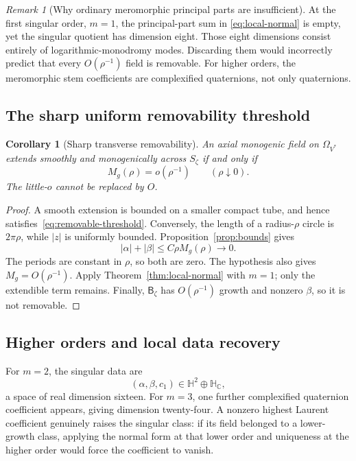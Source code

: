 \documentclass[11pt,a4paper]{article}
\numberwithin{equation}{section}
\newtheorem{corollary}[theorem]{Corollary}
\theoremstyle{definition}
\theoremstyle{remark}
\newtheorem{remark}[theorem]{Remark}
\newcommand{\C}{\mathbb C}
\newcommand{\HH}{\mathbb H}
\newcommand{\HC}{\mathbb H_{\C}}
\newcommand{\Bdef}{\mathsf B}
\begin{document}
\begin{remark}[Why ordinary meromorphic principal parts are insufficient]
At the first singular order, $m=1$, the principal-part sum in
\eqref{eq:local-normal} is empty, yet the singular quotient has dimension
eight. Those eight dimensions consist entirely of logarithmic-monodromy
modes. Discarding them would incorrectly predict that every
$O(\rho^{-1})$ field is removable. For higher orders, the meromorphic
stem coefficients are complexified quaternions, not only quaternions.
\end{remark}

\subsection{The sharp uniform removability threshold}
\begin{corollary}[Sharp transverse removability]\label{cor:removable}
An axial monogenic field on $\Omega_{V^*}$ extends smoothly and
monogenically across $S_\zeta$ if and only if
\begin{equation}
 M_g(\rho)=o(\rho^{-1})\qquad(\rho\downarrow0).
 \label{eq:removable-threshold}
\end{equation}
The little-$o$ cannot be replaced by $O$.
\end{corollary}
\begin{proof}
A smooth extension is bounded on a smaller compact tube, and hence
satisfies~\eqref{eq:removable-threshold}. Conversely, the length of a
radius-$\rho$ circle is $2\pi\rho$, while $|z|$ is uniformly bounded.
Proposition~\ref{prop:bounds} gives
\[
 |\alpha|+|\beta|\le C\rho M_g(\rho)\longrightarrow0.
\]
The periods are constant in $\rho$, so both are zero. The hypothesis
also gives $M_g=O(\rho^{-1})$. Apply Theorem~\ref{thm:local-normal}
with $m=1$; only the extendible term remains. Finally,
$\Bdef_\zeta$ has $O(\rho^{-1})$ growth and nonzero $\beta$, so it is
not removable.
\end{proof}

\subsection{Higher orders and local data recovery}
For $m=2$, the singular data are
\[
 (\alpha,\beta,c_1)\in\HH^2\oplus\HC,
\]
a space of real dimension sixteen. For $m=3$, one further complexified
quaternion coefficient appears, giving dimension twenty-four.
A nonzero highest Laurent coefficient genuinely raises the singular
class: if its field belonged to a lower-growth class, applying the
normal form at that lower order and uniqueness at the higher order
would force the coefficient to vanish.
\end{document}
